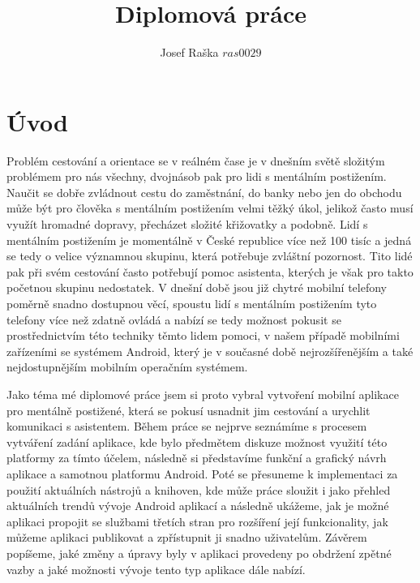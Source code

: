 \documentclass[czech,master,public,dept460,male,java,cpdeclaration]{diploma}
\title{Diplomová práce}
\author{Josef Raška \(ras0029\)}
\begin{document}
\MakeTitlePages
{}


\newpage

\section{Úvod}
Problém cestování a orientace se v reálném čase je v dnešním světě složitým problémem pro nás všechny,
dvojnásob pak pro lidi s mentálním postižením. Naučit se dobře zvládnout cestu do zaměstnání, do banky
nebo jen do obchodu může být pro člověka s mentálním postižením velmi těžký úkol, jelikož často musí
využít hromadné dopravy, přecházet složité křižovatky a podobně. Lidí s mentálním postižením
je momentálně v České republice více než 100 tisíc\cite{komunikace} a jedná se tedy o velice
významnou skupinu, která potřebuje zvláštní pozornost. Tito lidé pak při svém cestování často potřebují
pomoc asistenta, kterých je však pro takto početnou skupinu nedostatek.
V dnešní době jsou již chytré mobilní telefony poměrně snadno dostupnou věcí, spoustu lidí
s mentálním postižením tyto telefony více než zdatně ovládá a nabízí se tedy možnost pokusit se prostřednictvím
 této techniky těmto lidem pomoci, v našem případě mobilními zařízeními se systémem Android,
 který je v současné době nejrozšířenějším a také nejdostupnějším mobilním operačním systémem.

 Jako téma mé diplomové práce jsem si proto vybral vytvoření mobilní aplikace pro mentálně postižené,
 která se pokusí usnadnit jim cestování a urychlit komunikaci s asistentem. Během práce se nejprve
 seznámíme s procesem vytváření zadání aplikace, kde bylo předmětem diskuze možnost využití této platformy
 za tímto účelem, následně si představíme funkční a grafický návrh aplikace a samotnou platformu Android.
 Poté se přesuneme k implementaci za použití aktuálních nástrojů a knihoven, kde může práce sloužit
 i jako přehled aktuálních trendů vývoje Android aplikací a následně ukážeme, jak je možné aplikaci propojit
 se službami třetích stran pro rozšíření její funkcionality, jak
 můžeme aplikaci publikovat a zpřístupnit ji snadno uživatelům. Závěrem popíšeme, jaké
 změny a úpravy byly v aplikaci provedeny po obdržení zpětné vazby
 a jaké možnosti vývoje tento typ aplikace dále nabízí.
\end{document}
